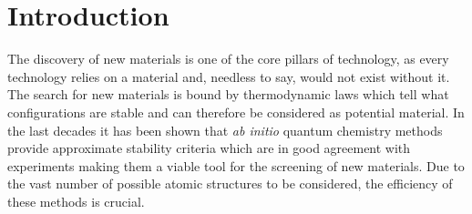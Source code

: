 \cleardoublepage
\chapter*{Introduction}
The discovery of new materials is one of the core pillars of technology, as every technology relies on a material and, needless to say, would not exist without it\cite{tomellini2013commentary}.
The search for new materials is bound by thermodynamic laws which tell what configurations are stable and can therefore be considered as potential material.
In the last decades it has been shown that \textit{ab initio} quantum chemistry methods provide approximate stability criteria which are in good agreement with experiments\cite{jansen2015conceptual} making them a viable tool for the screening of new materials\cite{ceder1998identification, andersson2006toward, yang2012search, gomez2016design}.
Due to the vast number of possible atomic structures to be considered, the efficiency of these methods is crucial.

%

